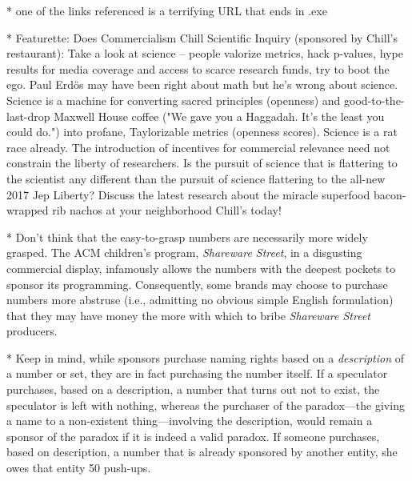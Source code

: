 * one of the links referenced is a terrifying URL that ends in .exe

* Featurette: Does Commercialism Chill Scientific Inquiry (sponsored by Chill's restaurant): Take a look at science -- people valorize metrics, hack p-values, hype results for media coverage and access to scarce research funds, try to boot the ego. Paul Erd\"os may have been right about math but he's wrong about science. Science is a machine for converting sacred principles (openness) and good-to-the-last-drop Maxwell House coffee ("We gave you a Haggadah. It's the least you could do.") into profane, Taylorizable metrics (openness scores). Science is a rat race already. The introduction of incentives for commercial relevance need not constrain the liberty of researchers. Is the pursuit of science that is flattering to the scientist any different than the pursuit of science flattering to the all-new 2017 Jep Liberty? Discuss the latest research about the miracle superfood bacon-wrapped rib nachos at your neighborhood Chill's today!  

* Don't think that the easy-to-grasp numbers are necessarily more widely grasped. The ACM children's program, \emph{Shareware Street}, in a disgusting commercial display, infamously allows the numbers with the deepest pockets to sponsor its programming. Consequently, some brands may choose to purchase numbers more abstruse (i.e., admitting no obvious simple English formulation) that they may have money the more with which to bribe \emph{Shareware Street} producers. 

* Keep in mind, while sponsors purchase naming rights based on a \emph{description} of a number or set, they are in fact purchasing the number itself. If a speculator purchases, based on a description, a number that turns out not to exist, the speculator is left with nothing, whereas the purchaser of the paradox---the giving a name to a non-existent thing---involving the description, would remain a sponsor of the paradox if it is indeed a valid paradox. If someone purchases, based on description, a number that is already sponsored by another entity, she owes that entity 50 push-ups.

 

